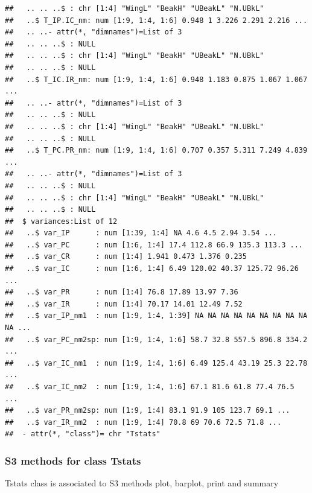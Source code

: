 \documentclass[12pt]{article}\usepackage[]{graphicx}\usepackage[]{color}
\makeatletter
\newenvironment{kframe}{%
 \def\at@end@of@kframe{}%
 \ifinner\ifhmode%
  \def\at@end@of@kframe{\end{minipage}}%
  \begin{minipage}{\columnwidth}%
 \fi\fi%
 \def\FrameCommand##1{\hskip\@totalleftmargin \hskip-\fboxsep
 \colorbox{shadecolor}{##1}\hskip-\fboxsep
     \hskip-\linewidth \hskip-\@totalleftmargin \hskip\columnwidth}%
 \MakeFramed {\advance\hsize-\width
   \@totalleftmargin\z@ \linewidth\hsize
   \@setminipage}}%
 {\par\unskip\endMakeFramed%
 \at@end@of@kframe}
\newenvironment{knitrout}{}{} %
\makeatother
\begin{document}
\begin{knitrout}
\begin{kframe}
\begin{verbatim}
##   .. .. ..$ : chr [1:4] "WingL" "BeakH" "UBeakL" "N.UBkL"
##   ..$ T_IP.IC_nm: num [1:9, 1:4, 1:6] 0.948 1 3.226 2.291 2.216 ...
##   .. ..- attr(*, "dimnames")=List of 3
##   .. .. ..$ : NULL
##   .. .. ..$ : chr [1:4] "WingL" "BeakH" "UBeakL" "N.UBkL"
##   .. .. ..$ : NULL
##   ..$ T_IC.IR_nm: num [1:9, 1:4, 1:6] 0.948 1.183 0.875 1.067 1.067 ...
##   .. ..- attr(*, "dimnames")=List of 3
##   .. .. ..$ : NULL
##   .. .. ..$ : chr [1:4] "WingL" "BeakH" "UBeakL" "N.UBkL"
##   .. .. ..$ : NULL
##   ..$ T_PC.PR_nm: num [1:9, 1:4, 1:6] 0.707 0.357 5.311 7.249 4.839 ...
##   .. ..- attr(*, "dimnames")=List of 3
##   .. .. ..$ : NULL
##   .. .. ..$ : chr [1:4] "WingL" "BeakH" "UBeakL" "N.UBkL"
##   .. .. ..$ : NULL
##  $ variances:List of 12
##   ..$ var_IP      : num [1:39, 1:4] NA 4.6 4.5 2.94 3.54 ...
##   ..$ var_PC      : num [1:6, 1:4] 17.4 112.8 66.9 135.3 113.3 ...
##   ..$ var_CR      : num [1:4] 1.941 0.473 1.376 0.235
##   ..$ var_IC      : num [1:6, 1:4] 6.49 120.02 40.37 125.72 96.26 ...
##   ..$ var_PR      : num [1:4] 76.8 17.89 13.97 7.36
##   ..$ var_IR      : num [1:4] 70.17 14.01 12.49 7.52
##   ..$ var_IP_nm1  : num [1:9, 1:4, 1:39] NA NA NA NA NA NA NA NA NA NA ...
##   ..$ var_PC_nm2sp: num [1:9, 1:4, 1:6] 58.7 32.8 557.5 896.8 334.2 ...
##   ..$ var_IC_nm1  : num [1:9, 1:4, 1:6] 6.49 125.4 43.19 25.3 22.78 ...
##   ..$ var_IC_nm2  : num [1:9, 1:4, 1:6] 67.1 81.6 61.8 77.4 76.5 ...
##   ..$ var_PR_nm2sp: num [1:9, 1:4] 83.1 91.9 105 123.7 69.1 ...
##   ..$ var_IR_nm2  : num [1:9, 1:4] 70.8 69 70.6 72.5 71.8 ...
##  - attr(*, "class")= chr "Tstats"
\end{verbatim}
\end{kframe}
\end{knitrout}


\subsubsection{S3 methods for class Tstats}
Tstats class is associated to S3 methods plot, barplot, print and summary
\end{document}
